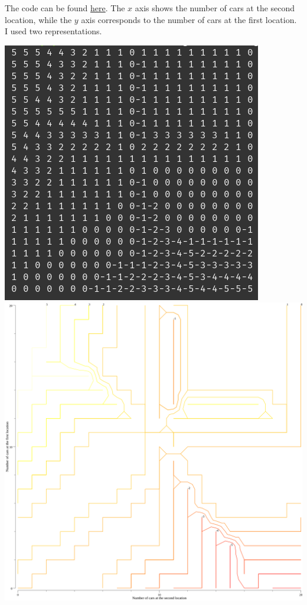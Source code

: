 \documentclass[12pt,a4paper]{article}
\begin{document}
\begin{enumerate}
    The code can be found \href{https://github.com/hannagabor/SBRL/blob/master/4.7/main.go}{here}.
    The $x$ axis shows the number of cars at the second location, while the $y$ axis corresponds
    to the number of cars at the first location. I used two representations.
    \begin{center}
      \includegraphics{printed_pi}
      \includegraphics[scale=0.3]{pi}
    \end{center}


\end{enumerate}
\end{document}

